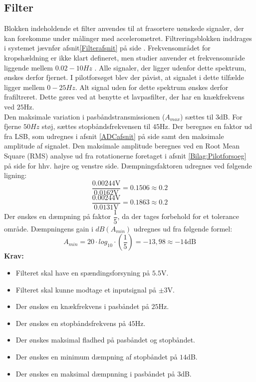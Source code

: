 \subsection{Filter}\label{FilterAfs}
Blokken indeholdende et filter anvendes til at frasortere uønskede signaler, der kan forekomme under målinger med accelerometret. Filtreringsblokken inddrages i systemet jævnfør afsnit\ref{Filterafsnit} på side \pageref{Filterafsnit}. Frekvensområdet for kropshældning er ikke klart defineret, men studier anvender et frekvensområde liggende mellem $0.02-10Hz$ \cite{Martinez-Mendez2011}. Alle signaler, der ligger udenfor dette spektrum, ønskes derfor fjernet. I pilotforsøget blev der påvist, at signalet i dette tilfælde ligger mellem $0-25Hz$. Alt signal uden for dette spektrum ønskes derfor frafiltreret. Dette gøres ved at benytte et lavpasfilter, der har en knækfrekvens ved $25$Hz. \\
Den maksimale variation i pasbåndstransmissionen ($A_{max}$) sættes til $3$dB. For fjerne $50Hz$ støj, sættes stopbåndsfrekvensen til $45$Hz. Der beregnes en faktor ud fra LSB, som udregnes i afsnit \ref{ADCafsnit} på side \pageref{ADCafsnit} samt den maksimale amplitude af signalet. Den maksimale amplitude beregnes ved en Root Mean Square (RMS) analyse ud fra rotationerne foretaget i afsnit \ref{Bilag:Pilotforsoeg} på side \pageref{Bilag:Pilotforsoeg} for hhv. højre og venstre side. Dæmpningsfaktoren udregnes ved følgende ligning:
\begin{equation}
\dfrac{0.00244\text{V}}{0.0162\text{V}} = 0.1506 \approx 0.2 
\end{equation}
\begin{equation}
\dfrac{0.00244\text{V}}{0.0131\text{V}} = 0.1863  \approx 0.2
\end{equation}
Der ønskes en dæmpning på faktor $\dfrac{1}{5}$, da der tages forbehold for et tolerance område. Dæmpningens gain i $dB(A_{min})$ udregnes ud fra følgende formel:   
\begin{equation}
A_{min}=20 \cdot log_{10} \cdot (\frac{1}{5}) = -13,98 \approx -14\text{dB}
\end{equation}
\textbf{Krav:}
\begin{itemize}
	\item Filteret skal have en spændingsforsyning på $5.5$V.
	\item Filteret skal kunne modtage et inputsignal på $\pm3$V.
	\item Der ønskes en knækfrekvens i pasbåndet på $25$Hz.
	\item Der ønskes en stopbåndsfrekvens på $45$Hz.
	\item Der ønskes maksimal fladhed på pasbåndet og stopbåndet.
	\item Der ønskes en minimum dæmpning af stopbåndet på $14$dB.
	\item Der ønskes en maksimal dæmpnning i pasbåndet på $3$dB.
\end{itemize}
